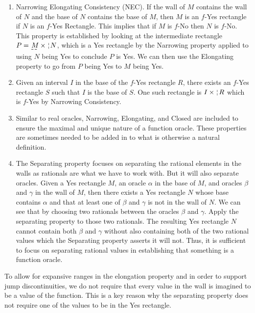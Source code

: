 \documentclass[12pt]{article}
\begin{document}
\begin{enumerate}
    \item Narrowing Elongating Consistency (NEC). If the wall of $M$ contains the wall of $N$ and the base of $N$ contains the base of $M$, then $M$ is an $f$-Yes rectangle if $N$  is an $f$-Yes Rectangle. This implies that if $M$ is $f$-No then $N$ is $f$-No. This property is established by looking at the intermediate rectangle $P = \base{M} \times \wall{N}$, which is a Yes rectangle by the Narrowing property applied to using $N$ being Yes to conclude $P$ is Yes. We can then use the Elongating property to go from $P$ being Yes to $M$ being Yes. 

    \item Given an interval $I$ in the base of the $f$-Yes rectangle $R$, there exists an $f$-Yes rectangle $S$ such that $I$ is the base of $S$. One such rectangle is $I \times \wall{R}$ which is $f$-Yes by Narrowing Consistency. 

    \item Similar to real oracles, Narrowing, Elongating, and Closed are included to ensure the maximal and unique nature of a function oracle. These properties are sometimes needed to be added in to what is otherwise a natural definition. 

    \item The Separating property focuses on separating the rational elements in the walls as rationals are what we have to work with. But it will also separate oracles. Given a Yes rectangle $M$, an oracle $\alpha$ in the base of $M$, and oracles $\beta$ and $\gamma$ in the wall of $M$, then there exists a Yes rectangle $N$ whose base contains $\alpha$ and that at least one of $\beta$ and $\gamma$ is not in the wall of $N$. We can see that by choosing two rationals between the oracles $\beta$ and $\gamma$. Apply the separating property to those two rationals. The resulting Yes rectangle $N$ cannot contain both $\beta$ and $\gamma$ without also containing both of the two rational values which the Separating property asserts it will not. Thus, it is sufficient to focus on separating rational values in establishing that something is a function oracle. 

\end{enumerate}

To allow for expansive ranges in the elongation property and in order to support jump discontinuities, we do not require that every value in the wall is imagined to be a value of the function. This is a key reason why the separating property does not require one of the values to be in the Yes rectangle. 
\end{document}
